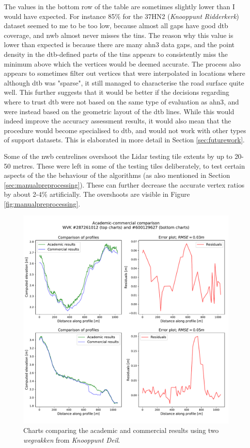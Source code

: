 The values in the bottom row of the table are sometimes slightly lower than I would have expected. For instance 85\% for the 37HN2 (\textit{Knooppunt Ridderkerk}) dataset seemed to me to be too low, because almost all gaps have good \ac{dtb} coverage, and \ac{nwb} almost never misses the \ac{tin}s. The reason why this value is lower than expected is because there are many \ac{ahn3} data gaps, and the point density in the \ac{dtb}-defined parts of the \ac{tin}s appears to consistently miss the minimum above which the vertices would be deemed accurate. The process also appears to sometimes filter out vertices that were interpolated in locations where although \ac{dtb} was "sparse", it still managed to characterise the road surface quite well. This further suggests that it would be better if the decisions regarding where to trust \ac{dtb} were not based on the same type of evaluation as \ac{ahn3}, and were instead based on the geometric layout of the \ac{dtb} lines. While this would indeed improve the accuracy assessment results, it would also mean that the procedure would become specialised to \ac{dtb}, and would not work with other types of support datasets. This is elaborated in more detail in Section \ref{sec:futurework}.

Some of the \ac{nwb} centrelines overshoot the Lidar testing tile extents by up to 20-50 metres. These were left in some of the testing tiles deliberately, to test certain aspects of the the behaviour of the algorithms (as also mentioned in Section \ref{sec:manualpreprocessing}). These can further decrease the accurate vertex ratios by about 2-4\% artificially. The overshoots are visible in Figure \ref{fig:manualpreprocessing}.

\begin{figure}[h]
    \centering
    \includegraphics[width=0.87\linewidth]{final_report/figs/commercialcomparison0.pdf}
    \caption[Charts comparing the academic and commercial results (\textit{Knooppunt Deil})]{Charts comparing the academic and commercial results using two \textit{wegvakken} from \textit{Knooppunt Deil}.}
    \label{fig:commercialcomparison0}
\end{figure}

